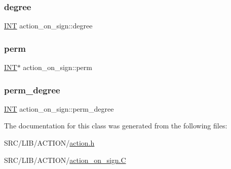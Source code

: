 \subsubsection{\texorpdfstring{degree}{degree}}
{\footnotesize\ttfamily \mbox{\hyperlink{galois_8h_a09fddde158a3a20bd2dcadb609de11dc}{I\+NT}} action\+\_\+on\+\_\+sign\+::degree}

\mbox{\label{classaction__on__sign_a7001e26142ce265ecb70ecaa8f2c07c6}} 
\subsubsection{\texorpdfstring{perm}{perm}}
{\footnotesize\ttfamily \mbox{\hyperlink{galois_8h_a09fddde158a3a20bd2dcadb609de11dc}{I\+NT}}$\ast$ action\+\_\+on\+\_\+sign\+::perm}

\mbox{\label{classaction__on__sign_aa818aeade989a7ce598fa261772289e1}} 
\subsubsection{\texorpdfstring{perm\+\_\+degree}{perm\_degree}}
{\footnotesize\ttfamily \mbox{\hyperlink{galois_8h_a09fddde158a3a20bd2dcadb609de11dc}{I\+NT}} action\+\_\+on\+\_\+sign\+::perm\+\_\+degree}



The documentation for this class was generated from the following files\+:\begin{DoxyCompactItemize}
\item 
S\+R\+C/\+L\+I\+B/\+A\+C\+T\+I\+O\+N/\mbox{\hyperlink{action_8h}{action.\+h}}\item 
S\+R\+C/\+L\+I\+B/\+A\+C\+T\+I\+O\+N/\mbox{\hyperlink{action__on__sign_8_c}{action\+\_\+on\+\_\+sign.\+C}}\end{DoxyCompactItemize}
